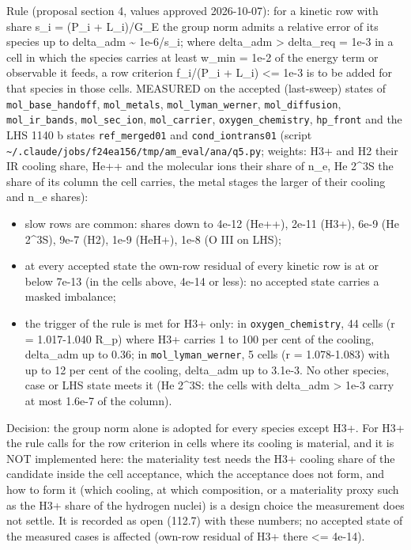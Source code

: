 \documentclass[english,a4paper]{my_memo}
\providecommand{\tightlist}{\setlength{\itemsep}{0pt}\setlength{\parskip}{0pt}}
\begin{document}
Rule (proposal section 4, values approved 2026-10-07): for a kinetic row with
share s\_i = (P\_i + L\_i)/G\_E the group norm admits a relative error of its
species up to delta\_adm \textasciitilde{} 1e-6/s\_i; where delta\_adm \textgreater{} delta\_req = 1e-3 in a
cell in which the species carries at least w\_min = 1e-2 of the energy term or
observable it feeds, a row criterion \textbar f\_i\textbar/(P\_i + L\_i) \textless= 1e-3 is to be added
for that species in those cells. MEASURED on the accepted (last-sweep) states
of \texttt{mol\_base\_handoff}, \texttt{mol\_metals}, \texttt{mol\_lyman\_werner}, \texttt{mol\_diffusion},
\texttt{mol\_ir\_bands}, \texttt{mol\_sec\_ion}, \texttt{mol\_carrier}, \texttt{oxygen\_chemistry},
\texttt{hp\_front} and the LHS 1140 b states \texttt{ref\_merged01} and \texttt{cond\_iontrans01}
(script \texttt{\textasciitilde{}/.claude/jobs/f24ea156/tmp/am\_eval/ana/q5.py}; weights: H3+ and H2
their IR cooling share, He++ and the molecular ions their share of n\_e, He
2\^{}3S the share of its column the cell carries, the metal stages the larger of
their cooling and n\_e shares):

\begin{itemize}
\tightlist
\item
  slow rows are common: shares down to 4e-12 (He++), 2e-11 (H3+), 6e-9 (He
  2\^{}3S), 9e-7 (H2), 1e-9 (HeH+), 1e-8 (O III on LHS);
\item
  at every accepted state the own-row residual of every kinetic row is at or
  below 7e-13 (in the cells above, 4e-14 or less): no accepted state carries a
  masked imbalance;
\item
  the trigger of the rule is met for H3+ only: in \texttt{oxygen\_chemistry}, 44
  cells (r = 1.017-1.040 R\_p) where H3+ carries 1 to 100 per cent of the
  cooling, delta\_adm up to 0.36; in \texttt{mol\_lyman\_werner}, 5 cells (r =
  1.078-1.083) with up to 12 per cent of the cooling, delta\_adm up to 3.1e-3.
  No other species, case or LHS state meets it (He 2\^{}3S: the cells with
  delta\_adm \textgreater{} 1e-3 carry at most 1.6e-7 of the column).
\end{itemize}

Decision: the group norm alone is adopted for every species except H3+. For
H3+ the rule calls for the row criterion in cells where its cooling is
material, and it is NOT implemented here: the materiality test needs the H3+
cooling share of the candidate inside the cell acceptance, which the
acceptance does not form, and how to form it (which cooling, at which
composition, or a materiality proxy such as the H3+ share of the hydrogen
nuclei) is a design choice the measurement does not settle. It is recorded
as open (112.7) with these numbers; no accepted state of the measured cases
is affected (own-row residual of H3+ there \textless= 4e-14).
\end{document}
